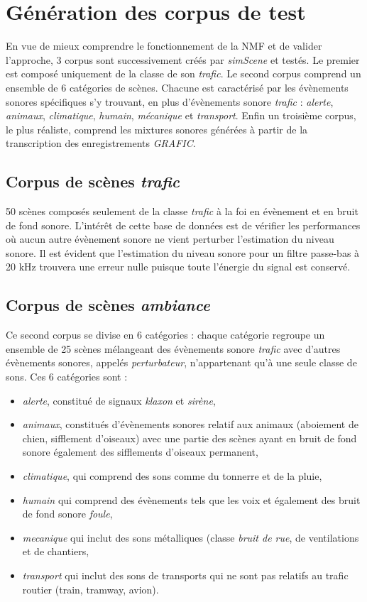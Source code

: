 \section{Génération des corpus de test}
En vue de mieux comprendre le fonctionnement de la NMF et de valider l'approche, 3 corpus sont successivement créés par \textit{simScene} et testés. Le premier est composé uniquement de la classe de son \textit{trafic}. Le second corpus comprend un ensemble de 6 catégories de scènes. Chacune est caractérisé par les évènements sonores spécifiques s'y trouvant, en plus d'évènements sonore \textit{trafic} : \textit{alerte}, \textit{animaux}, \textit{climatique}, \textit{humain}, \textit{mécanique} et \textit{transport}. Enfin un troisième corpus, le plus réaliste, comprend les mixtures sonores générées à partir de la transcription des enregistrements \textit{GRAFIC}.

\subsection{Corpus de scènes \textit{trafic}}
50 scènes composés seulement de la classe \textit{trafic} à la foi en évènement et en bruit de fond sonore. L'intérêt de cette base de données est de vérifier les performances où aucun autre évènement sonore ne vient perturber l'estimation du niveau sonore. Il est évident que l'estimation du niveau sonore pour un filtre passe-bas à 20 kHz trouvera une erreur nulle puisque toute l'énergie du signal est conservé. 

\subsection{Corpus de scènes \textit{ambiance}}

Ce second corpus se divise en 6 catégories : chaque catégorie regroupe un ensemble de 25 scènes mélangeant des évènements sonore \textit{trafic} avec d'autres évènements sonores,  appelés \textit{perturbateur}, n'appartenant qu'à une seule classe de sons. Ces 6 catégories sont : 

\begin{itemize}
\item \textit{alerte}, constitué de signaux \textit{klaxon} et \textit{sirène},
\item \textit{animaux}, constitués d'évènements sonores relatif aux animaux (aboiement de chien, sifflement d'oiseaux) avec une partie des scènes ayant en bruit de fond sonore également des sifflements d'oiseaux permanent,
\item \textit{climatique}, qui comprend des sons comme du tonnerre et de la pluie,
\item \textit{humain} qui comprend des évènements tels que les voix et également des bruit de fond sonore \textit{foule}, 
\item \textit{mecanique} qui inclut des sons métalliques (classe \textit{bruit de rue}, de ventilations et de chantiers,
\item \textit{transport} qui inclut des sons de transports qui ne sont pas relatifs au trafic routier (train, tramway, avion).\\
\end{itemize}


